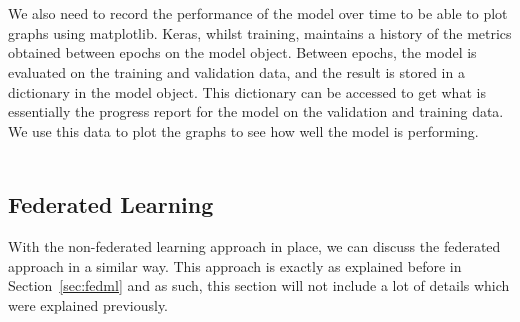 \documentclass[12pt]{article}
\begin{document}
\\\\
We also need to record the performance of the model over time to be able to plot graphs using matplotlib. Keras, whilst training, maintains a history of the metrics obtained between epochs on the model object. Between epochs, the model is evaluated on the training and validation data, and the result is stored in a dictionary in the model object. This dictionary can be accessed to get what is essentially the progress report for the model on the validation and training data. We use this data to plot the graphs to see how well the model is performing. 
\\\\
\subsection{Federated Learning}\label{subsec:fedml-core}
With the non-federated learning approach in place, we can discuss the federated approach in a similar way. This approach is exactly as explained before in Section~\ref{sec:fedml} and as such, this section will not include a lot of details which were explained previously. 
\end{document}
